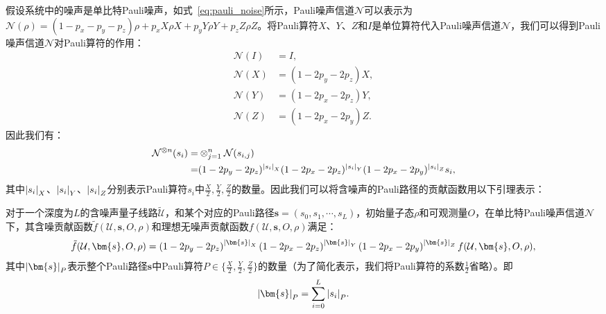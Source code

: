假设系统中的噪声是单比特Pauli噪声，如式~\eqref{eq:pauli_noise}所示，Pauli噪声信道$\mathcal{N}$可以表示为$\mathcal{N}(\rho) = (1-p_x-p_y-p_z)\rho + p_x X\rho X + p_y Y\rho Y + p_z Z\rho Z$。将Pauli算符$X$、$Y$、$Z$和$I$是单位算符代入Pauli噪声信道$\mathcal{N}$，我们可以得到Pauli噪声信道$\mathcal{N}$对Pauli算符的作用：
\begin{equation}
    \begin{aligned}
        \mathcal{N}(I) &= I,\\
        \mathcal{N}(X) &= (1-2p_y-2p_z)X,\\
        \mathcal{N}(Y) &= (1-2p_x-2p_z)Y,\\
        \mathcal{N}(Z) &= (1-2p_x-2p_y)Z.
    \end{aligned}
\end{equation}
因此我们有：
\begin{equation}
    \begin{aligned}
        \mathcal{N}^{\otimes n}(s_i)= &\otimes_{j=1}^{n}\mathcal{N}(s_{i,j})\\
        =&(1-2p_y-2p_z)^{\abs{s_i}_X}(1-2p_x-2p_z)^{\abs{s_i}_Y}(1-2p_x-2p_y)^{\abs{s_i}_Z}s_i,
    \end{aligned}
\end{equation}
其中$\abs{s_i}_X$、$\abs{s_i}_Y$、$\abs{s_i}_Z$分别表示Pauli算符$s_i$中$\frac{X}{2},\frac{Y}{2},\frac{Z}{2}$的数量。因此我们可以将含噪声的Pauli路径的贡献函数用以下引理表示：
\begin{lemma}\label{lemma:noise}
    对于一个深度为$L$的含噪声量子线路$\widetilde{\mathcal{U}}$，和某个对应的Pauli路径$\bm{s}= (s_0, s_1, \cdots, s_L)$，初始量子态$\rho$和可观测量$O$，在单比特Pauli噪声信道$\mathcal{N}$下，其含噪贡献函数$\tilde{f}(\mathcal{U},\bm{s},O,\rho)$和理想无噪声贡献函数$f(\mathcal{U},\bm{s},O,\rho)$满足：
    \begin{equation}
        \tilde{f}(\mathcal{U},\bm{s},O,\rho)=\left(1-2p_y-2p_z\right)^{\abs{\bm{s}}_X}\left(1-2p_x-2p_z\right)^{\abs{\bm{s}}_Y}\left(1-2p_x-2p_y\right)^{\abs{\bm{s}}_Z}f(\mathcal{U},\bm{s},O,\rho),
    \end{equation}
    其中$\abs{\bm{s}}_P$表示整个Pauli路径$\bm{s}$中Pauli算符$P\in \{\frac{X}{2},\frac{Y}{2},\frac{Z}{2}\}$的数量（为了简化表示，我们将Pauli算符的系数$\frac{1}{2}$省略）。即
    \begin{equation}
        \abs{\bm{s}}_P = \sum_{i=0}^{L}\abs{s_i}_P.
    \end{equation}
\end{lemma}


